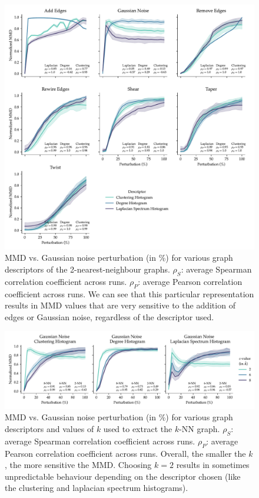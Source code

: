 \begin{figure}
  \centering
  \includegraphics[width=\textwidth]{./figures/results/res_1_3.pdf}
  \caption[2-nearest-neighbour graphs result in descriptors highly sensitive to
the addition of edges and Gaussian noise.]{MMD vs. Gaussian noise perturbation
(in \%) for various graph descriptors of the 2-nearest-neighbour graphs.
$\rho_{S}$: average Spearman correlation coefficient across runs. $\rho_{P}$:
average Pearson correlation coefficient across runs. We can see that this
particular representation results in MMD values that are very sensitive to the
addition of edges or Gaussian noise, regardless of the descriptor used.}
  \label{fig:mmd_k_nn_graphs}
\end{figure}

\begin{figure}
  \includegraphics[width=\textwidth]{./figures/results/res_1_4.pdf}
  \caption[Influence of $k$ on the resulting MMD values.]{MMD vs. Gaussian noise
perturbation (in \%) for various graph descriptors and values of $k$ used to
extract the $k$-NN graph. $\rho_{S}$: average Spearman correlation
coefficient across runs. $\rho_{P}$: average Pearson correlation coefficient
across runs. Overall, the smaller the $k$, the more sensitive the
MMD. Choosing $k=2$ results in sometimes unpredictable behaviour depending on
the descriptor chosen (like the clustering and laplacian spectrum histograms).}
  \label{fig:k_vs_turbulence_gaussian_noise}

\end{figure}


